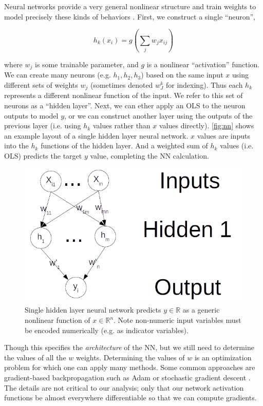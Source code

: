 \documentclass[12pt]{article}
\begin{document}
Neural networks provide a very general nonlinear structure and train weights to model precisely these kinds of behaviors \cite{hastie2009elements}.  First, we construct a single ``neuron'',

$$
h_k(x_i) = g(\sum_j w_j x_{ij})
$$

where $w_j$ is some trainable parameter, and $g$ is a nonlinear ``activation'' function.  We can create many neurons (e.g. $h_1, h_2, h_3$) based on the same input $x$ using different sets of weights $w_j$ (sometimes denoted $w_J^k$ for indexing).  Thus each $h_k$ represents a different nonlinear function of the input.  We refer to this set of neurons as a ``hidden layer''.  Next, we can ether apply an OLS to the neuron outputs to model $y$, or we can construct another layer using the outputs of the previous layer (i.e. using $h_k$ values rather than $x$ values directly).  \autoref{fig:nn} shows an example layout of a single hidden layer neural network.  $x$ values are inputs into the $h_k$ functions of the hidden layer.  And a weighted sum of $h_k$ values  (i.e. OLS) predicts the target $y$ value, completing the NN calculation.

\begin{figure}[htb]
\centering
    \includegraphics[scale=0.75]{figs/nn.png}
    \caption{Single hidden layer neural network predicts $y \in \mathbb{R}$ as a generic nonlinear function of $x \in \mathbb{R}^n$.  Note non-numeric input variables must be encoded numerically (e.g. as indicator variables).}
    \label{fig:nn}
\end{figure}

Though this specifies the \emph{architecture} of the NN, but we still need to determine the values of all the $w$ weights.  Determining the values of $w$ is an optimization problem for which one can apply many methods.  Some common approaches are gradient-based backpropagation such as Adam \cite{kingma2014adam} or stochastic gradient descent \cite{hastie2009elements}.  The details are not critical to our analysis; only that our network activation functions be almost everywhere differentiable so that we can compute gradients.
\end{document}
